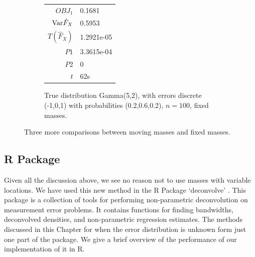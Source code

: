 \begin{figure}
\begin{subfigure}[b]{0.38\textwidth}
		\begin{tabular}{r l}
			$OBJ_1$ & 0.1681\\
			$\mathrm{Var} \hat{F}_X$ & 0.5953\\
			$T(\hat{F}_X)$ & 1.2921e-05\\
			$P1$ & 3.3615e-04\\
			$P2$ & 0\\
			$t$ & 62s
		\end{tabular}
		\caption{True distribution Gamma(5,2), with errors discrete (-1,0,1) with probabilities (0.2,0.6,0.2), $n = 100$, fixed masses.}
		\label{fig:fixed masses gamma discrete}
	\end{subfigure}
	\caption{Three more comparisons between moving masses and fixed masses.}
	\label{fig:more deconvolution examples}
	\end{figure}

\subsection{R Package}
Given all the discussion above, we see no reason not to use masses with variable locations. We have used this new method in the R \cite{R_Core_Team2018-bs} Package `deconvolve' \cite{Delaigle2019-hj}. This package is a collection of tools for performing non-parametric deconvolution on measurement error problems. It contains functions for finding bandwidths, deconvolved densities, and non-parametric regression estimates. The methods discussed in this Chapter for when the error distribution is unknown form just one part of the package. We give a brief overview of the performance of our implementation of it in R.

